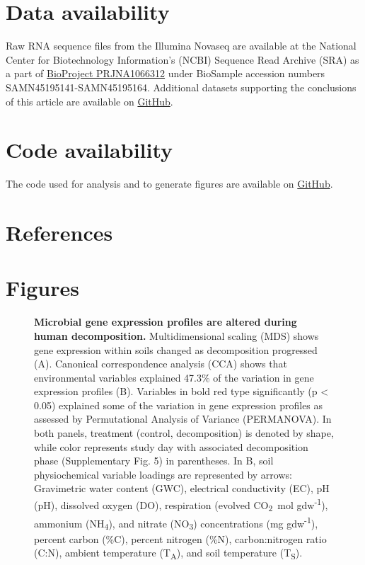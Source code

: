 \documentclass[
  sn-nature,
  lineno, referee]{sn-jnl}
\begin{document}
\section{Data availability}\label{data-availability}

Raw RNA sequence files from the Illumina Novaseq are available at the
National Center for Biotechnology Information's (NCBI) Sequence Read
Archive (SRA) as a part of
\href{https://www.ncbi.nlm.nih.gov/bioproject/PRJNA1066312/}{BioProject
PRJNA1066312} under BioSample accession numbers
SAMN45195141-SAMN45195164. Additional datasets supporting the
conclusions of this article are available on
\href{https://github.com/amason30/Mason_MetaT_XXX_2024}{GitHub}.

\section{Code availability}\label{code-availability}

The code used for analysis and to generate figures are available on
\href{https://github.com/amason30/Mason_MetaT_XXX_2024}{GitHub}.

\section{References}\label{references}

\renewcommand{\bibsection}{}


\newpage

\section{Figures}\label{figures}

\begin{figure}[!h]
\caption{{\bf Microbial gene expression profiles are altered during human decomposition.}
Multidimensional scaling (MDS) shows gene expression within soils changed as decomposition progressed (A). Canonical correspondence analysis (CCA) shows that environmental variables explained 47.3\% of the variation in gene expression profiles (B). Variables in bold red type significantly (p < 0.05) explained some of the variation in gene expression profiles as assessed by Permutational Analysis of Variance (PERMANOVA). In both panels, treatment (control, decomposition) is denoted by shape, while color represents study day with associated decomposition phase (Supplementary Fig. 5) in parentheses. In B, soil physiochemical variable loadings are represented by arrows: Gravimetric water content (GWC), electrical conductivity (EC), pH (pH), dissolved oxygen (DO), respiration (evolved CO\textsubscript{2}\ \textmu mol gdw\textsuperscript{-1}), ammonium (NH\textsubscript{4}), and nitrate (NO\textsubscript{3}) concentrations (mg gdw\textsuperscript{-1}), percent carbon (\%C), percent nitrogen (\%N), carbon:nitrogen ratio (C:N), ambient temperature (T\textsubscript{A}), and soil temperature (T\textsubscript{S}).}
\label{fig-mds}
\end{figure}
\end{document}
